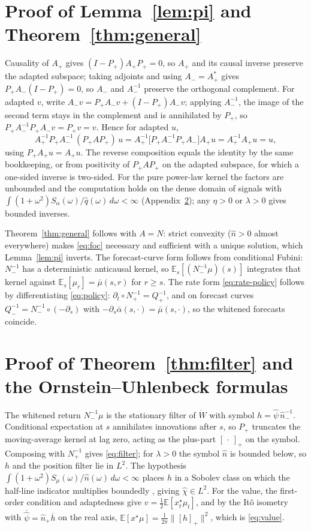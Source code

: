 \documentclass[11pt]{article}
\newcommand{\E}{\mathbb{E}}
\newcommand{\pluspart}[1]{\left[#1\right]_+}
\theoremstyle{plain}
\theoremstyle{definition}
\theoremstyle{remark}
\begin{document}
\section{Proof of Lemma~\ref{lem:pi} and Theorem~\ref{thm:general}}\label{app:A}
Causality of $A_+$ gives $(I-P_+)A_+P_+=0$, so $A_+$ and its causal inverse preserve the adapted subspace; taking adjoints and using $A_-=A_+^*$ gives $P_+A_-(I-P_+)=0$, so $A_-$ and $A_-^{-1}$ preserve the orthogonal complement. For adapted $v$, write $A_-v=P_+A_-v+(I-P_+)A_-v$; applying $A_-^{-1}$, the image of the second term stays in the complement and is annihilated by $P_+$, so $P_+A_-^{-1}P_+A_-v=P_+v=v$. Hence for adapted $u$,
\[
A_+^{-1}P_+A_-^{-1}\,(P_+AP_+)\,u = A_+^{-1}\bigl[P_+A_-^{-1}P_+A_-\bigr]A_+u = A_+^{-1}A_+u = u,
\]
using $P_+A_+u=A_+u$. The reverse composition equals the identity by the same bookkeeping, or from positivity of $P_+AP_+$ on the adapted subspace, for which a one-sided inverse is two-sided. For the pure power-law kernel the factors are unbounded and the computation holds on the dense domain of signals with $\int(1+\omega^2)S_\alpha(\omega)/\hat q(\omega)\,d\omega<\infty$ (Appendix~\ref{app:B}); any $\eta>0$ or $\lambda>0$ gives bounded inverses.

Theorem~\ref{thm:general} follows with $A=N$: strict convexity ($\hat n>0$ almost everywhere) makes \eqref{eq:foc} necessary and sufficient with a unique solution, which Lemma~\ref{lem:pi} inverts. The forecast-curve form follows from conditional Fubini: $N_-^{-1}$ has a deterministic anticausal kernel, so $\E_s[(N_-^{-1}\mu)(s)]$ integrates that kernel against $\E_s[\mu_r]=\bar\mu(s,r)$ for $r\ge s$. The rate form \eqref{eq:rate-policy} follows by differentiating \eqref{eq:policy}: $\partial_t\circ N_+^{-1}=Q_+^{-1}$, and on forecast curves $Q_-^{-1}=N_-^{-1}\circ(-\partial_s)$ with $-\partial_s\bar\alpha(s,\cdot)=\bar\mu(s,\cdot)$, so the whitened forecasts coincide.

\section{Proof of Theorem~\ref{thm:filter} and the Ornstein--Uhlenbeck formulas}\label{app:B}
The whitened return $N_-^{-1}\mu$ is the stationary filter of $\dot W$ with symbol $h=\hat\psi\,\hat n_-^{-1}$. Conditional expectation at $s$ annihilates innovations after $s$, so $P_+$ truncates the moving-average kernel at lag zero, acting as the plus-part $\pluspart{\,\cdot\,}$ on the symbol. Composing with $N_+^{-1}$ gives \eqref{eq:filter}; for $\lambda>0$ the symbol $\hat n$ is bounded below, so $h$ and the position filter lie in $L^2$. The hypothesis $\int(1+\omega^2)S_\mu(\omega)/\hat n(\omega)\,d\omega<\infty$ places $h$ in a Sobolev class on which the half-line indicator multiplies boundedly \citep[Ch.~1]{LionsMagenes1972}, giving $\hat\chi\in L^2$. For the value, the first-order condition and adaptedness give $v=\tfrac12\E[x^\star_t\mu_t]$, and by the It\^o isometry with $\overline{\hat\psi}=\hat n_+\overline h$ on the real axis, $\E[x^\star\mu]=\tfrac1{2\pi}\|\pluspart{h}\|^2$, which is \eqref{eq:value}.
\end{document}
